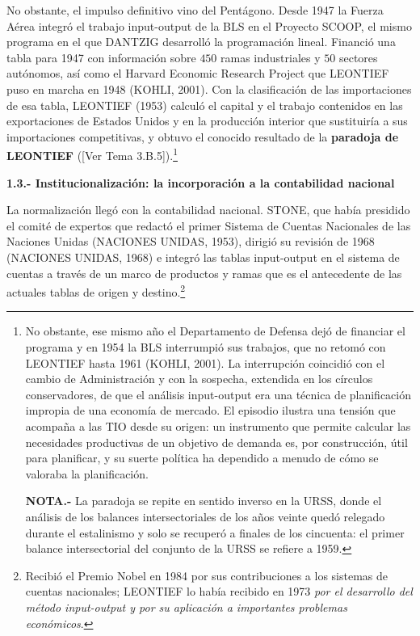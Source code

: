 \documentclass[10pt,a4paper]{article}
\newcommand{\authorfont}[1]{{\fontfamily{EBGaramond-TLF}\selectfont #1}}
\begin{document}
No obstante, el impulso definitivo vino del Pentágono. Desde 1947 la Fuerza Aérea integró el trabajo input-output de la BLS en el Proyecto SCOOP, el mismo programa en el que DANTZIG desarrolló la programación lineal. Financió una tabla para 1947 con información sobre $450$ ramas industriales y $50$ sectores autónomos, así como el Harvard Economic Research Project que LEONTIEF puso en marcha en 1948 (KOHLI, 2001). Con la clasificación de las importaciones de esa tabla, LEONTIEF (1953) calculó el capital y el trabajo contenidos en las exportaciones de Estados Unidos y en la producción interior que sustituiría a sus importaciones competitivas, y obtuvo el conocido resultado de la \textbf{paradoja de LEONTIEF} ([\authorfont{Ver Tema 3.B.5}]).\footnote{%
    No obstante, ese mismo año el Departamento de Defensa dejó de financiar el programa y en 1954 la BLS interrumpió sus trabajos, que no retomó con LEONTIEF hasta 1961 (KOHLI, 2001). La interrupción coincidió con el cambio de Administración y con la sospecha, extendida en los círculos conservadores, de que el análisis input-output era una técnica de planificación impropia de una economía de mercado. El episodio ilustra una tensión que acompaña a las TIO desde su origen: un instrumento que permite calcular las necesidades productivas de un objetivo de demanda es, por construcción, útil para planificar, y su suerte política ha dependido a menudo de cómo se valoraba la planificación.

    \textbf{NOTA.-} La paradoja se repite en sentido inverso en la URSS, donde el análisis de los balances intersectoriales de los años veinte quedó relegado durante el estalinismo y solo se recuperó a finales de los cincuenta: el primer balance intersectorial del conjunto de la URSS se refiere a 1959.
}

\textbf{1.3.- Institucionalización: la incorporación a la contabilidad nacional}

La normalización llegó con la contabilidad nacional. STONE, que había presidido el comité de expertos que redactó el primer Sistema de Cuentas Nacionales de las Naciones Unidas (NACIONES UNIDAS, 1953), dirigió su revisión de 1968 (NACIONES UNIDAS, 1968) e integró las tablas input-output en el sistema de cuentas a través de un marco de productos y ramas que es el antecedente de las actuales tablas de origen y destino.\footnote{%
  Recibió el Premio Nobel en 1984 por sus contribuciones a los sistemas de cuentas nacionales; LEONTIEF lo había recibido en 1973 \textit{por el desarrollo del método input-output y por su aplicación a importantes problemas económicos}.
}
\end{document}
